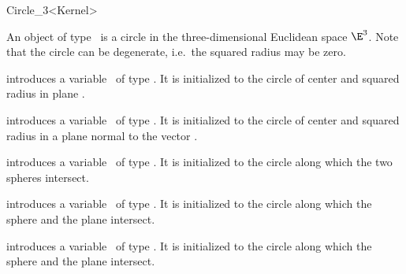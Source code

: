 \begin{ccRefClass}{Circle_3<Kernel>}

\ccDefinition

An object of type \ccRefName\ is a circle in the
three-dimensional Euclidean space $\E^3$. Note that the
circle can be degenerate, i.e.\ the squared radius may be zero.

\ccCreation
{}

\ccHidden
{}

	{introduces a variable \ccVar\ of type \ccClassTemplateName.
        It is initialized to the circle of center  and 
	squared radius  in plane .
	}

	{introduces a variable \ccVar\ of type \ccClassTemplateName.
        It is initialized to the circle of center  and 
	squared radius  in a plane normal to
	the vector .
	}

	{introduces a variable \ccVar\ of type \ccClassTemplateName.
        It is initialized to the circle along which the two spheres intersect.
	}

	{introduces a variable \ccVar\ of type \ccClassTemplateName.
        It is initialized to the circle along which the sphere and the 
	plane intersect.
	}

	{introduces a variable \ccVar\ of type \ccClassTemplateName.
        It is initialized to the circle along which the sphere and the 
	plane intersect.
	}

\ccHidden
{}


\end{ccRefClass}
